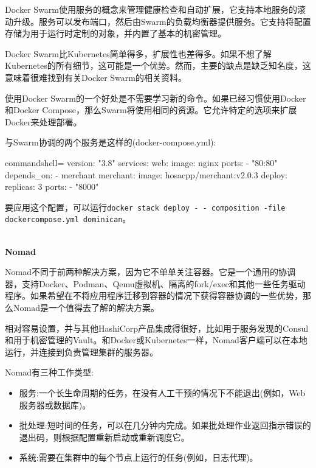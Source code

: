 Docker Swarm使用服务的概念来管理健康检查和自动扩展，它支持本地服务的滚动升级。服务可以发布端口，然后由Swarm的负载均衡器提供服务。它支持将配置存储为用于运行时定制的对象，并内置了基本的机密管理。

Docker Swarm比Kubernetes简单得多，扩展性也差得多。如果不想了解Kubernetes的所有细节，这可能是一个优势。然而，主要的缺点是缺乏知名度，这意味着很难找到有关Docker Swarm的相关资料。

使用Docker Swarm的一个好处是不需要学习新的命令。如果已经习惯使用Docker和Docker Compose，那么Swarm将使用相同的资源。它允许特定的选项来扩展Docker来处理部署。

与Swarm协调的两个服务是这样的(docker-compose.yml):

\begin{tcblisting}{commandshell={}}
version: "3.8"
services:
  web:
    image: nginx
    ports:
      - "80:80"
    depends_on:
      - merchant
  merchant:
    image: hosacpp/merchant:v2.0.3
    deploy:
      replicas: 3
    ports:
      - "8000"
\end{tcblisting}

要应用这个配置，可以运行\texttt{docker stack deploy -\,- composition -file dockercompose.yml dominican}。

\hspace*{\fill} \\ %
\noindent
\textbf{Nomad}

Nomad不同于前两种解决方案，因为它不单单关注容器。它是一个通用的协调器，支持Docker、Podman、Qemu虚拟机、隔离的fork/exec和其他一些任务驱动程序。如果希望在不将应用程序迁移到容器的情况下获得容器协调的一些优势，那么Nomad是一个值得去了解的解决方案。

相对容易设置，并与其他HashiCorp产品集成得很好，比如用于服务发现的Consul和用于机密管理的Vault。和Docker或Kubernetes一样，Nomad客户端可以在本地运行，并连接到负责管理集群的服务器。

Nomad有三种工作类型:

\begin{itemize}
\item 
服务:一个长生命周期的任务，在没有人工干预的情况下不能退出(例如，Web服务器或数据库)。

\item 
批处理:短时间的任务，可以在几分钟内完成。如果批处理作业返回指示错误的退出码，则根据配置重新启动或重新调度它。

\item 
系统:需要在集群中的每个节点上运行的任务(例如，日志代理)。
\end{itemize}

